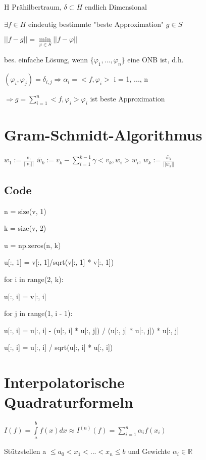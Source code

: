 \documentclass[12pt,a4paper]{article} %
\newcommand*\tab[1][1cm]{\hspace*{#1}}
\begin{document}
	H Prähilbertraum, $\delta \subset H$ endlich Dimensional
	
	$\exists f \in H$ eindeutig bestimmte "beste Approximation" $g \in S$
	
	\tab $||f - g|| = \min\limits_{\varphi \in S}||f - \varphi||$
	
	bes. einfache Lösung, wenn \{$\varphi_1, ..., \varphi_n$\} eine ONB ist, d.h.
	
	$(\varphi_i, \varphi_j) = \delta_{i, j} \Rightarrow \alpha_i = <f, \varphi_i>$ \tab i = 1, ..., n
	
	\tab $\Rightarrow g = \sum\limits_{i = 1}^{n}<f, \varphi_i>\varphi_i$ ist beste Approximation
	
	\newpage
	
	\section{Gram-Schmidt-Algorithmus}
	
	$w_1 := \frac{v_1}{||v_1||}$ \space $\tilde{w_k}:=v_k - \sum\limits_{i = 1}^{k - 1}\gamma<v_k, w_i>w_i$, \space $w_k := \frac{\tilde{w_k}}{||\tilde{w_k}||}$
	
	\subsection{Code}
	
	n = size(v, 1)
	
	k = size(v, 2)
	
	u = np.zeros(n, k)
	
	u[:, 1] = v[:, 1]/sqrt(v[:, 1] * v[:, 1])
	
	for i in range(2, k):
	
	\tab u[:, i] = v[:, i]
	
	\tab for j in range(1, i - 1):
	
	\tab \tab u[:, i] = u[:, i] - (u[:, i] * u[:, j]) / (u[:, j] * u[:, j]) * u[:, j]
	
	\tab u[:, i] = u[:, i] / sqrt(u[:, i] * u[:, i])
	
	\newpage
	
	\section{Interpolatorische Quadraturformeln}
	
	$I(f) = \int\limits_{a}^{b}f(x)dx \approx I^{(n)}(f) = \sum\limits_{i = 1}^{n}\alpha_if(x_i)$
	
	Stützstellen a $\le a_0 < x_1 < ... < x_n \le b$ und Gewichte $\alpha_i \in \mathbb{R}$
	
\end{document}
